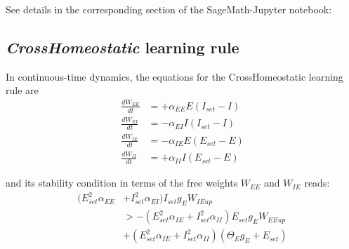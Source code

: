 \documentclass[twocolumn]{article}
\newcommand{\EE}{\mathit{EE}}
\newcommand{\EI}{\mathit{EI}}
\newcommand{\IE}{\mathit{IE}}
\newcommand{\II}{\mathit{II}}
\newcommand{\set}{\mathit{set}}
\newcommand{\up}{\mathit{up}}
\begin{document}
See details in the corresponding section of the SageMath-Jupyter notebook:






\subsection{{\em CrossHomeostatic} learning rule}

In continuous-time dynamics, the equations for the CrossHomeostatic learning rule are
\begin{equation}
\begin{aligned}
\frac{dW_{\EE}}{dt} & = +\alpha_{\EE} E (I_{\set} - I) \\
\frac{dW_{\EI}}{dt} & = -\alpha_{\EI} I (I_{\set} - I) \\
\frac{dW_{\IE}}{dt} & = -\alpha_{\IE} E (E_{\set} - E) \\
\frac{dW_{\II}}{dt} & = +\alpha_{\II} I (E_{\set} - E)
\end{aligned}
\label{eq.CH_equation}
\end{equation}

\noindent and its stability condition in terms of the free weights $W_{\EE}$ and $W_{\IE}$ reads:
\begin{equation}
\begin{aligned}
(E_{\set}^2 \alpha_{\EE} & + I_{\set}^2 \alpha_{\EI}) I_{\set} g_E W_{\IE\up} \\
& >
-(E_{\set}^2 \alpha_{\IE} + I_{\set}^2 \alpha_{\II}) E_{\set} g_E W_{\EE\up} \\
& +
(E_{\set}^2 \alpha_{\IE} + I_{\set}^2 \alpha_{\II}) (\Theta_E g_E + E_{\set})
\end{aligned}
\label{eq.CH_stable_cond_v1}
\end{equation}
\end{document}
